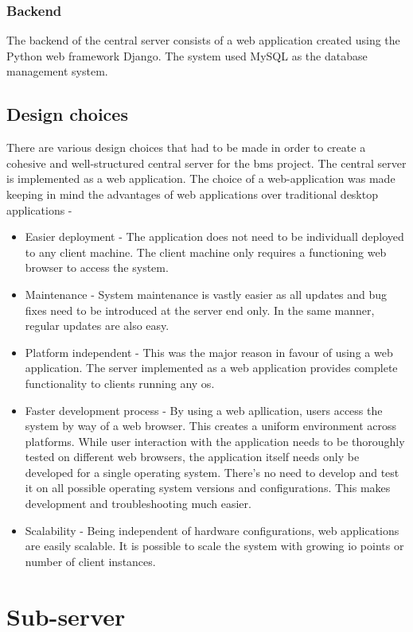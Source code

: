 \documentclass[letterpaper,11pt]{report}
\begin{document}
\subsubsection{Backend}
The backend of the central server consists of a web application created using the Python web framework Django. The system used MySQL as the database management system.
\subsection{Design choices}
There are various design choices that had to be made in order to create a cohesive and well-structured central server for the \ac{bms} project. The central server is implemented as a web application. The choice of a web-application was made keeping in mind the advantages of web applications over traditional desktop applications -
\begin{itemize}
    \item Easier deployment - The application does not need to be individuall deployed to any client machine. The client machine only requires a functioning web browser to access the system.
    \item Maintenance - System maintenance is vastly easier as all updates and bug fixes need to be introduced at the server end only. In the same manner, regular updates are also easy.
    \item Platform independent - This was the major reason in favour of using a web application. The server implemented as a web application provides complete functionality to clients running any \ac{os}.
    \item Faster development process - By using a web apllication, users access the system by way of a web browser. This creates a uniform environment across platforms. While user interaction with the application needs to be thoroughly tested on different web browsers, the application itself needs only be developed for a single operating system. There’s no need to develop and test it on all possible operating system versions and configurations. This makes development and troubleshooting much easier.
    \item Scalability - Being independent of hardware configurations, web applications are easily scalable. It is possible to scale the system with growing \ac{io} points or number of client instances.
\end{itemize}
\section{Sub-server}
\end{document}
